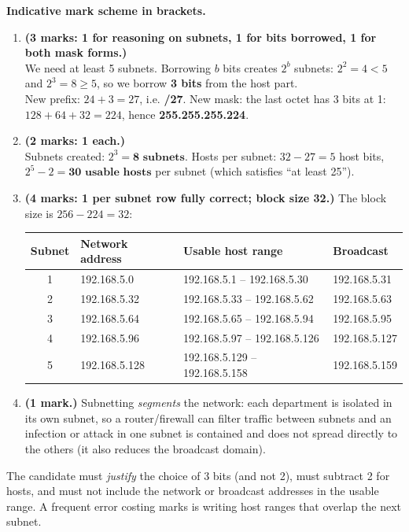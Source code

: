 \documentclass[11pt]{article}
\begin{document}
\begin{corrige}
\textbf{Indicative mark scheme in brackets.}

\begin{enumerate}
\item \textbf{(3 marks: 1 for reasoning on subnets, 1 for bits borrowed, 1 for both mask forms.)}\\
We need at least 5 subnets. Borrowing $b$ bits creates $2^b$ subnets: $2^2 = 4 < 5$ and $2^3 = 8 \ge 5$, so we borrow \textbf{3 bits} from the host part.\\
New prefix: $24 + 3 = 27$, i.e. \textbf{/27}. New mask: the last octet has 3 bits at 1: $128+64+32 = 224$, hence \textbf{255.255.255.224}.
\item \textbf{(2 marks: 1 each.)}\\
Subnets created: $2^3 = \textbf{8 subnets}$. Hosts per subnet: $32 - 27 = 5$ host bits, $2^5 - 2 = \textbf{30 usable hosts}$ per subnet (which satisfies ``at least 25'').
\item \textbf{(4 marks: 1 per subnet row fully correct; block size 32.)} The block size is $256 - 224 = 32$:
\begin{center}
\begin{tabularx}{\linewidth}{|c|l|X|l|}
\hline
\rowcolor{popblueL} \textbf{Subnet} & \textbf{Network address} & \textbf{Usable host range} & \textbf{Broadcast} \\
\hline
1 & 192.168.5.0 & 192.168.5.1 -- 192.168.5.30 & 192.168.5.31 \\
\hline
2 & 192.168.5.32 & 192.168.5.33 -- 192.168.5.62 & 192.168.5.63 \\
\hline
3 & 192.168.5.64 & 192.168.5.65 -- 192.168.5.94 & 192.168.5.95 \\
\hline
4 & 192.168.5.96 & 192.168.5.97 -- 192.168.5.126 & 192.168.5.127 \\
\hline
5 & 192.168.5.128 & 192.168.5.129 -- 192.168.5.158 & 192.168.5.159 \\
\hline
\end{tabularx}
\end{center}
\item \textbf{(1 mark.)} Subnetting \emph{segments} the network: each department is isolated in its own subnet, so a router/firewall can filter traffic between subnets and an infection or attack in one subnet is contained and does not spread directly to the others (it also reduces the broadcast domain).
\end{enumerate}
\begin{attention}
The candidate must \emph{justify} the choice of 3 bits (and not 2), must subtract 2 for hosts, and must not include the network or broadcast addresses in the usable range. A frequent error costing marks is writing host ranges that overlap the next subnet.
\end{attention}
\end{corrige}
\end{document}
